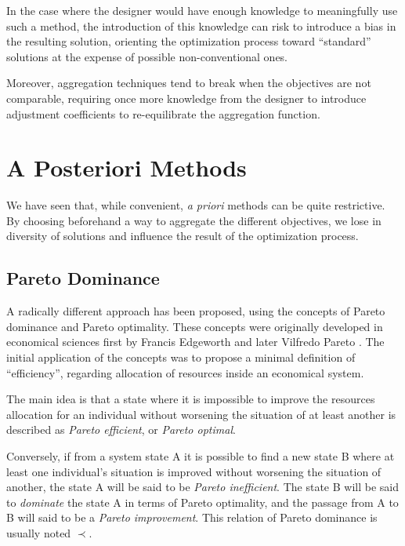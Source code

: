 In the case where the designer would have enough knowledge to meaningfully use such a method, the introduction of this knowledge can risk to introduce a bias in the resulting solution, orienting the optimization process toward \enquote{standard} solutions at the expense of possible non-conventional ones.

Moreover, aggregation techniques tend to break when the objectives are not comparable, requiring once more knowledge from the designer to introduce adjustment coefficients to re-equilibrate the aggregation function.

\section{A Posteriori Methods}

We have seen that, while convenient, \emph{a priori} methods can be quite restrictive. By choosing beforehand a way to aggregate the different objectives, we lose in diversity of solutions and influence the result of the optimization process.

\subsection{Pareto Dominance}

A radically different approach has been proposed, using the concepts of Pareto dominance and Pareto optimality. These concepts were originally developed in economical sciences first by Francis Edgeworth and later Vilfredo Pareto \cite{nla.cat-vn2742363}. The initial application of the concepts was to propose a minimal definition of \enquote{efficiency}, regarding allocation of resources inside an economical system.

The main idea is that a state where it is impossible to improve the resources allocation for an individual without worsening the situation of at least another is described as \emph{Pareto efficient}, or \emph{Pareto optimal}.

Conversely, if from a system state A it is possible to find a new state B where at least one individual's situation is improved without worsening the situation of another, the state A will be said to be \emph{Pareto inefficient}. The state B will be said to \emph{dominate} the state A in terms of Pareto optimality, and the passage from A to B will said to be a \emph{Pareto improvement}. This relation of Pareto dominance is usually noted \(\prec\).


